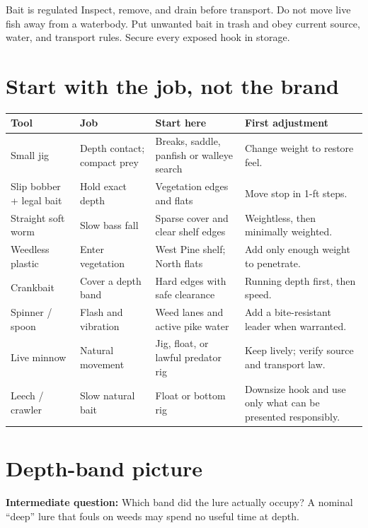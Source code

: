 
\begin{teloshazard}{Bait is regulated}
Inspect, remove, and drain before transport. Do not move live fish away from a
waterbody. Put unwanted bait in trash and obey current source, water, and
transport rules. Secure every exposed hook in storage.
\end{teloshazard}

\section{Start with the job, not the brand}
\begin{longtable}{@{}p{.17\linewidth}p{.22\linewidth}p{.31\linewidth}p{.22\linewidth}@{}}
\toprule\textbf{Tool}&\textbf{Job}&\textbf{Start here}&\textbf{First adjustment}\\\midrule
Small jig&Depth contact; compact prey&Breaks, saddle, panfish or walleye
search&Change weight to restore feel.\\
Slip bobber + legal bait&Hold exact depth&Vegetation edges and flats&Move stop
in 1-ft steps.\\
Straight soft worm&Slow bass fall&Sparse cover and clear shelf edges&Weightless,
then minimally weighted.\\
Weedless plastic&Enter vegetation&West Pine shelf; North flats&Add only enough
weight to penetrate.\\
Crankbait&Cover a depth band&Hard edges with safe clearance&Running depth first,
then speed.\\
Spinner / spoon&Flash and vibration&Weed lanes and active pike water&Add a
bite-resistant leader when warranted.\\
Live minnow&Natural movement&Jig, float, or lawful predator rig&Keep lively;
verify source and transport law.\\
Leech / crawler&Slow natural bait&Float or bottom rig&Downsize hook and use only
what can be presented responsibly.\\
\bottomrule
\end{longtable}

\section{Depth-band picture}
\begin{center}
\end{center}
\textbf{Intermediate question:} Which band did the lure actually occupy? A
nominal “deep” lure that fouls on weeds may spend no useful time at depth.

